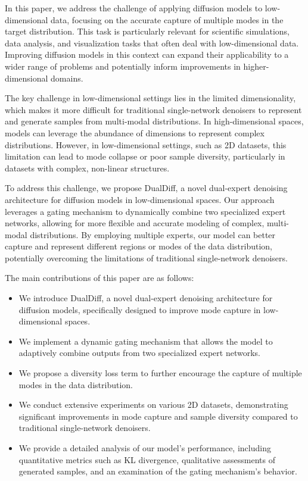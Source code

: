 \documentclass{article} %
\begin{document}
In this paper, we address the challenge of applying diffusion models to low-dimensional data, focusing on the accurate capture of multiple modes in the target distribution. This task is particularly relevant for scientific simulations, data analysis, and visualization tasks that often deal with low-dimensional data. Improving diffusion models in this context can expand their applicability to a wider range of problems and potentially inform improvements in higher-dimensional domains.

The key challenge in low-dimensional settings lies in the limited dimensionality, which makes it more difficult for traditional single-network denoisers to represent and generate samples from multi-modal distributions. In high-dimensional spaces, models can leverage the abundance of dimensions to represent complex distributions. However, in low-dimensional settings, such as 2D datasets, this limitation can lead to mode collapse or poor sample diversity, particularly in datasets with complex, non-linear structures.

To address this challenge, we propose DualDiff, a novel dual-expert denoising architecture for diffusion models in low-dimensional spaces. Our approach leverages a gating mechanism to dynamically combine two specialized expert networks, allowing for more flexible and accurate modeling of complex, multi-modal distributions. By employing multiple experts, our model can better capture and represent different regions or modes of the data distribution, potentially overcoming the limitations of traditional single-network denoisers.

The main contributions of this paper are as follows:

\begin{itemize}
    \item We introduce DualDiff, a novel dual-expert denoising architecture for diffusion models, specifically designed to improve mode capture in low-dimensional spaces.
    \item We implement a dynamic gating mechanism that allows the model to adaptively combine outputs from two specialized expert networks.
    \item We propose a diversity loss term to further encourage the capture of multiple modes in the data distribution.
    \item We conduct extensive experiments on various 2D datasets, demonstrating significant improvements in mode capture and sample diversity compared to traditional single-network denoisers.
    \item We provide a detailed analysis of our model's performance, including quantitative metrics such as KL divergence, qualitative assessments of generated samples, and an examination of the gating mechanism's behavior.
\end{itemize}
\end{document}
